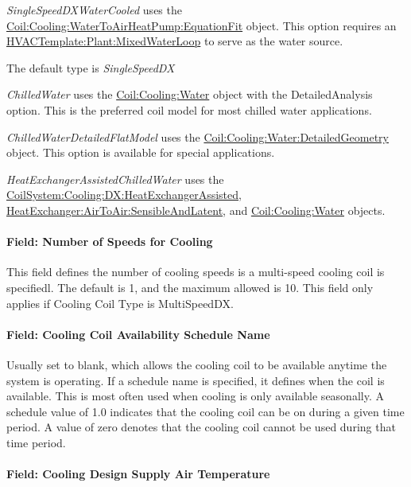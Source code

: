 \emph{SingleSpeedDXWaterCooled} uses the \hyperref[coilcoolingwatertoairheatpumpequationfit]{Coil:Cooling:WaterToAirHeatPump:EquationFit} object. This option requires an \hyperref[hvactemplateplantmixedwaterloop]{HVACTemplate:Plant:MixedWaterLoop} to serve as the water source.

The default type is \emph{SingleSpeedDX}

\emph{ChilledWater} uses the \hyperref[coilcoolingwater]{Coil:Cooling:Water} object with the DetailedAnalysis option. This is the preferred coil model for most chilled water applications.

\emph{ChilledWaterDetailedFlatModel} uses the \hyperref[coilcoolingwaterdetailedgeometry]{Coil:Cooling:Water:DetailedGeometry} object. This option is available for special applications.

\emph{HeatExchangerAssistedChilledWater} uses the \hyperref[coilsystemcoolingdxheatexchangerassisted]{CoilSystem:Cooling:DX:HeatExchangerAssisted}, \hyperref[heatexchangerairtoairsensibleandlatent]{HeatExchanger:AirToAir:SensibleAndLatent}, and \hyperref[coilcoolingwater]{Coil:Cooling:Water} objects.

\paragraph{Field: Number of Speeds for Cooling}\label{field-number-of-speeds-for-cooling}

This field defines the number of cooling speeds is a multi-speed cooling coil is specifiedl. The default is 1, and the maximum allowed is 10. This field only applies if Cooling Coil Type is MultiSpeedDX.

\paragraph{Field: Cooling Coil Availability Schedule Name}\label{field-cooling-coil-availability-schedule-name-6}

Usually set to blank, which allows the cooling coil to be available anytime the system is operating. If a schedule name is specified, it defines when the coil is available. This is most often used when cooling is only available seasonally. A schedule value of 1.0 indicates that the cooling coil can be on during a given time period. A value of zero denotes that the cooling coil cannot be used during that time period.

\paragraph{Field: Cooling Design Supply Air Temperature}\label{field-cooling-design-supply-air-temperature-2}

